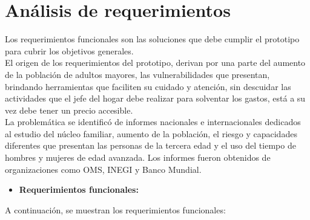\section{Análisis de requerimientos}

Los requerimientos funcionales son las soluciones que debe cumplir el prototipo para cubrir los objetivos generales. \\

El origen de los requerimientos del prototipo, derivan por una parte del aumento de la población de adultos mayores, las vulnerabilidades que presentan, brindando herramientas que faciliten su cuidado y atención, sin descuidar las actividades que el jefe del hogar debe realizar para solventar los gastos, está a su vez debe tener un precio accesible. \\

La problemática se identificó de informes nacionales e internacionales dedicados al estudio del núcleo familiar, aumento de la población, el riesgo y capacidades diferentes que presentan las personas de la tercera edad y el uso del tiempo de hombres y mujeres de edad avanzada. Los informes fueron obtenidos de organizaciones como OMS, INEGI y Banco Mundial. \\

\begin{itemize}
	\item \textbf{Requerimientos funcionales:}
\end{itemize}

A continuación, se muestran los requerimientos funcionales: \\


